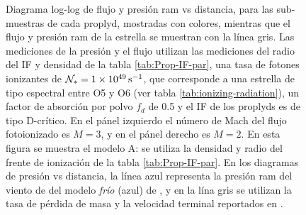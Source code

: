 \begin{figure}
  \caption[Diagrama log-log de flujo y presión ram vs distancia para las sub-muestras de cada proplyd]{Diagrama log-log de flujo y presión ram vs distancia, para las sub-muestras de cada proplyd, mostradas con colores, mientras que el flujo y presión ram de la estrella se muestran con la línea gris. Las mediciones de la presión y el flujo utilizan las mediciones del radio del IF y densidad de la tabla \ref{tab:Prop-IF-par}, una tasa de fotones ionizantes de $\mathcal{N}_* = \SI{1e49}{s^{-1}}$, que corresponde a una estrella de tipo espectral entre O5 y O6 (ver tabla \ref{tab:ionizing-radiation}), un factor de absorción por polvo  $f_d$ de 0.5 y el IF de los proplyds es de tipo D-crítico. En el pánel izquierdo el número de Mach del flujo fotoionizado es $M=3$, y en el pánel derecho es $M=2$. En esta figura se muestra el modelo A: se utiliza la densidad y radio del frente de ionización de la tabla \ref{tab:Prop-IF-par}. En los diagramas de presión vs distancia, la línea azul representa la presión ram del viento de \thC{} del modelo \textit{frío} (azul) de \citet{Gagne:2005}, y en la lína gris se utilizan la tasa de pérdida de masa y la velocidad terminal reportados en \citet{GAH:2002}.}
  \label{fig:wind-fits}
\end{figure}

